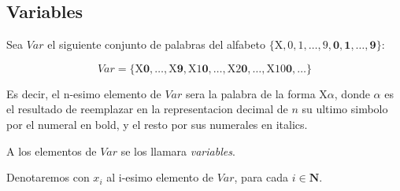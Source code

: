 \subsection{Variables}

\begin{definition}
Sea $Var$ el siguiente conjunto de palabras del alfabeto 
$\{\text{X}, \mathit{0}, \mathit{1}, \dots, \mathit{9}, \mathbf{0}, \mathbf{1}, \dots, \mathbf{9}\}$:

$$
Var = \{\text{X}\mathbf{0}, \dots, \text{X}\mathbf{9}, \text{X}\mathit{1}\mathbf{0}, \dots, \text{X}\mathit{2}\mathbf{0}, \dots, \text{X}\mathit{10}\mathbf{0}, \dots\}
$$

Es decir, el n-esimo elemento de $Var$ sera la palabra de la forma $\text{X}\alpha$, donde $\alpha$ es el resultado de reemplazar en 
la representacion decimal de $n$ su ultimo simbolo por el numeral en bold, y el resto por sus numerales en italics.

A los elementos de $Var$ se los llamara \emph{variables}.

Denotaremos con $x_i$ al i-esimo elemento de $Var$, para cada $i \in \mathbf{N}$.
\end{definition}

